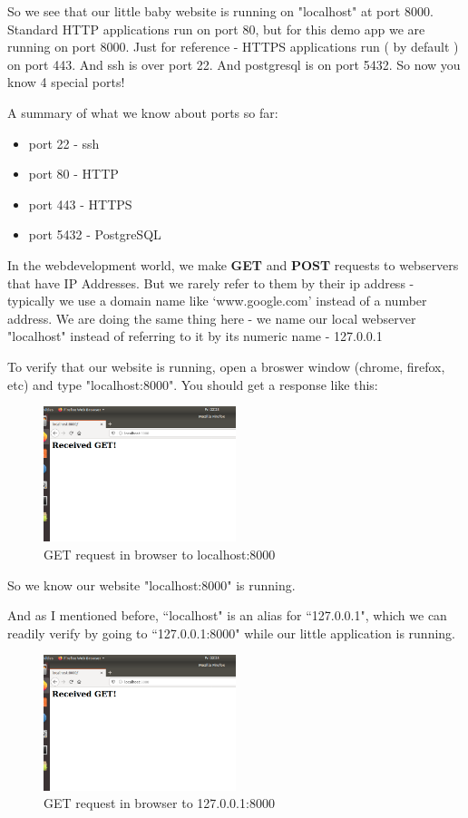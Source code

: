 \documentclass[10pt]{article}
\begin{document}
So we see that our little baby website is running on "localhost" at port 8000. Standard HTTP applications run on port 80, but for this demo app we are running on port 8000. Just for reference - HTTPS applications run ( by default ) on port 443. And ssh is over port 22. And postgresql is on port 5432. So now you know 4 special ports!

A summary of what we know about ports so far:
\begin{itemize}
\item port 22 - ssh
\item port 80 - HTTP
\item port 443 - HTTPS
\item port 5432 - PostgreSQL
\end{itemize}

In the webdevelopment world, we make \textbf{GET} and \textbf{POST} requests to webservers that have IP Addresses. But we rarely refer to them by their ip address - typically we use a domain name like `www.google.com' instead of a number address. We are doing the same thing here - we name our local webserver "localhost" instead of referring to it by its numeric name - 127.0.0.1 

To verify that our website is running, open a broswer window (chrome, firefox, etc) and type "localhost:8000". You should get a response like this:

\begin{figure}[h]
  \centering
    \includegraphics[width=0.5\textwidth]{GET.png}
  \caption{GET request in browser to localhost:8000}
\end{figure}

So we know our website "localhost:8000" is running.

And as I mentioned before, ``localhost" is an alias for ``127.0.0.1", which we can readily verify by going to ``127.0.0.1:8000" while our little application is running.

\begin{figure}[h]
  \centering
    \includegraphics[width=0.5\textwidth]{GET.png}
  \caption{GET request in browser to 127.0.0.1:8000 }
\end{figure}
\end{document}
